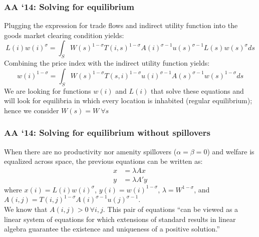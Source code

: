 \documentclass[10pt,notes=hide]{beamer}
\begin{document}
\begin{frame}
\frametitle{AA `14: Solving for equilibrium}
Plugging the expression for trade flows and indirect utility function into the goods market clearing condition yields:
\begin{equation*}
L(i)w(i)^{\sigma}=\int_{S} W(s)^{1-\sigma} T(i,s)^{1-\sigma}A(i)^{\sigma-1}u(s)^{\sigma-1}L(s)w(s)^{\sigma}ds 
\end{equation*}
Combining the price index with the indirect utility function yields:
\begin{equation*}
w(i)^{1-\sigma}=\int_{S} W(s)^{1-\sigma} T(s,i)^{1-\sigma}u\left(i\right)^{\sigma-1}A(s)^{\sigma-1}w(s)^{1-\sigma}ds 
\end{equation*}
We are looking for functions $w(i)$ and $ L(i)$ that solve these equations and will look for equilibria in which every location is inhabited (regular equilibrium); hence we consider $W(s) = W \ \forall s$
\end{frame}
\begin{frame}
\frametitle{AA `14: Solving for equilibrium without spillovers}
When there are no productivity nor amenity spillovers ($\alpha=\beta=0$) and welfare is equalized across space, the previous equations can be written as:
\begin{align*}
x &= \lambda A x \\
y &= \lambda A' y
\end{align*}
where $x(i) = L(i) w(i)^{\sigma}$, $y(i) = w(i)^{1-\sigma}$, $\lambda=W^{1-\sigma}$, and $A(i,j) = T(i,j)^{1-\sigma} A(i)^{\sigma-1} u(j)^{\sigma-1}$. \\
We know that  $A(i,j) > 0 \ \forall i,j$.
This pair of equations ``can be viewed as a linear system of equations for which extensions of standard results in linear algebra guarantee the existence and uniqueness of a positive solution.''
\end{frame}
\end{document}
